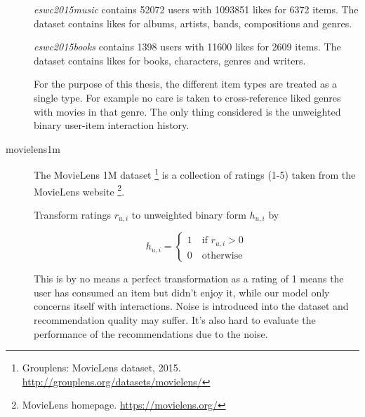 \begin{description}
        \textit{eswc2015music} contains 52072 users with 1093851 likes for 6372 items. The dataset contains likes for albums, artists, bands, compositions and genres.

        \textit{eswc2015books} contains 1398 users with 11600 likes for 2609 items. The dataset contains likes for books, characters, genres and writers.

        For the purpose of this thesis, the different item types are treated as a single type. For example no care is taken to cross-reference liked genres with movies in that genre. The only thing considered is the unweighted binary user-item interaction history.





    \item[movielens1m] \hfill

        The MovieLens 1M dataset \footnote{Grouplens: MovieLens dataset, 2015. \url{http://grouplens.org/datasets/movielens/}} is a collection of ratings (1-5) taken from the MovieLens website \footnote{MovieLens homepage. \url{https://movielens.org/}}.

        Transform ratings $r_{u, i}$ to unweighted binary form $h_{u, i}$ by

        \begin{equation}
            h_{u, i} = \begin{cases}
                1 \quad \text{if } r_{u, i} > 0 \\
                0 \quad \text{otherwise}
            \end{cases}
        \end{equation}

        This is by no means a perfect transformation as a rating of 1 means the user has consumed an item but didn't enjoy it, while our model only concerns itself with interactions. Noise is introduced into the dataset and recommendation quality may suffer. It's also hard to evaluate the performance of the recommendations due to the noise.


\end{description}

